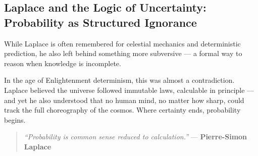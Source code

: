 \subsection{Laplace and the Logic of Uncertainty: Probability as Structured Ignorance}

While Laplace is often remembered for celestial mechanics and deterministic prediction, he also left behind something more subversive — a formal way to reason when knowledge is incomplete.

In the age of Enlightenment determinism, this was almost a contradiction. Laplace believed the universe followed immutable laws, calculable in principle — and yet he also understood that no human mind, no matter how sharp, could track the full choreography of the cosmos. Where certainty ends, probability begins.

\begin{quote}
\textit{“Probability is common sense reduced to calculation.”}  
— \textbf{Pierre-Simon Laplace}
\end{quote}


